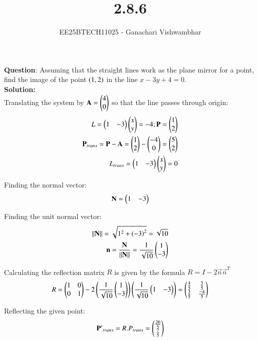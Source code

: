 \documentclass[journal]{IEEEtran}
\begin{document}
\title{2.8.6}
\author{EE25BTECH11025 - Ganachari Vishwambhar}
\maketitle

\textbf{Question}:\newline
Assuming that the straight lines work as the plane mirror for a point, find the image of the point $\left(1,2\right)$ in the line $x-3y+4=0$.\\
\textbf{Solution: }\\
Translating the system by $\mathbf{A}=\begin{pmatrix}4\\0\end{pmatrix}$ so that the line passes through origin:
\begin{align}
    L=\begin{pmatrix}1&-3\end{pmatrix}\begin{pmatrix}x\\y\end{pmatrix}=-4;
    \mathbf{P}=\begin{pmatrix}1\\2\end{pmatrix}\\
    \mathbf{P}_{trans}=\mathbf{P}-\mathbf{A}=\begin{pmatrix}1\\2\end{pmatrix}-\begin{pmatrix}-4\\0\end{pmatrix}=\begin{pmatrix}5\\2\end{pmatrix}\\
    L_{trans}=\begin{pmatrix}1&-3\end{pmatrix}\begin{pmatrix}x\\y\end{pmatrix}=0
\end{align}

Finding the normal vector:
\begin{align}
    \mathbf{N}=\begin{pmatrix}1&-3\end{pmatrix}
\end{align}

Finding the unit normal vector:
\begin{align}
    ||\mathbf{N}||=\sqrt{1^2+\left(-3\right)^2}=\sqrt{10}\\
    \mathbf{n}=\frac{\mathbf{N}}{||\mathbf{N}||}=\frac{1}{\sqrt{10}}\begin{pmatrix}1\\-3\end{pmatrix}
\end{align}

Calculating the reflection matrix $R$ is given by the formula $R=I-2\vec{n}\vec{n}^T$
\begin{align}
    R=\begin{pmatrix}1&0\\0&1\end{pmatrix}-2\left(\frac{1}{\sqrt{10}}\begin{pmatrix}1\\-3\end{pmatrix}\right)\left(\frac{1}{\sqrt{10}}\begin{pmatrix}1&-3\end{pmatrix}\right)
    =\begin{pmatrix}\frac{4}{5}&\frac{3}{5}\\ \frac{3}{5}&\frac{-4}{5}\end{pmatrix}
\end{align}


Reflecting the given point:
\begin{align}
    \mathbf{P'}_{trans}=R.P_{trans}=\begin{pmatrix}\frac{26}{5}\\ \frac{7}{5}\end{pmatrix}
\end{align}
\end{document}
